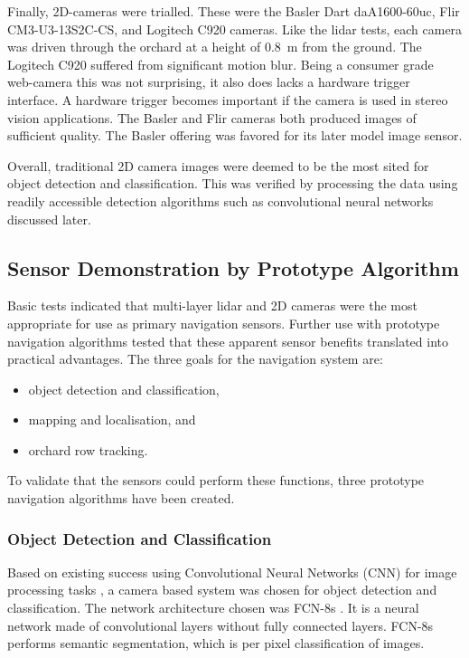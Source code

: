 \documentclass[preprint,authoryear,12pt]{elsarticle}
\begin{document}
        Finally, 2D-cameras were trialled.
        These were the Basler Dart daA1600-60uc, Flir CM3-U3-13S2C-CS, and Logitech C920 cameras.
        Like the lidar tests, each camera was driven through the orchard at a height of \SI{0.8}{\meter} from the ground.
        The Logitech C920 suffered from significant motion blur.
        Being a consumer grade web-camera this was not surprising, it also does lacks a hardware trigger interface.
        A hardware trigger becomes important if the camera is used in stereo vision applications.
        The Basler and Flir cameras both produced images of sufficient quality.
        The Basler offering was favored for its later model image sensor.

        Overall, traditional 2D camera images were deemed to be the most sited for object detection and classification.
        This was verified by processing the data using readily accessible detection algorithms such as convolutional neural networks discussed later.

\subsection{Sensor Demonstration by Prototype Algorithm}

    Basic tests indicated that multi-layer lidar and 2D cameras were the most appropriate for use as primary navigation sensors.
    Further use with prototype navigation algorithms tested that these apparent sensor benefits translated into practical advantages.
    The three goals for the navigation system are:

    \begin{itemize}
        \item object detection and classification,
        \item mapping and localisation, and
        \item orchard row tracking.
    \end{itemize}
    To validate that the sensors could perform these functions, three prototype navigation algorithms have been created.

    \subsubsection{Object Detection and Classification}

        Based on existing success using Convolutional Neural Networks (CNN) for image processing tasks \citep{LeCun2015}, a camera based system was chosen for object detection and classification.
    	The network architecture chosen was FCN-8s \citep{long2015}.
        It is a neural network made of convolutional layers without fully connected layers.
    	FCN-8s performs semantic segmentation, which is per pixel classification of images.
\end{document}
